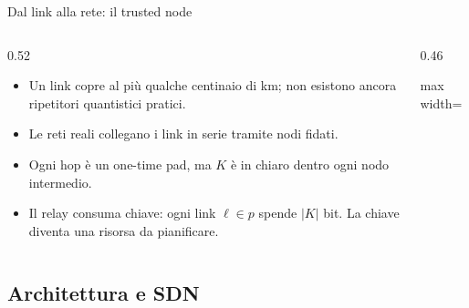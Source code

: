 \documentclass[10pt]{beamer}
\begin{document}
\begin{frame}{Dal link alla rete: il trusted node}
  \begin{columns}[c]
    \begin{column}{0.52\textwidth}
      \begin{itemize}
        \item Un link copre al più qualche centinaio di km; non esistono
              ancora ripetitori quantistici pratici.
        \item Le reti reali collegano i link in serie tramite
              \alert{nodi fidati}.
        \item Ogni hop è un one-time pad, ma $K$ è in chiaro dentro ogni
              nodo intermedio.
        \item Il relay \alert{consuma chiave}: ogni link $\ell\in p$ spende
              $|K|$ bit. La chiave diventa una risorsa da pianificare.
      \end{itemize}
    \end{column}
    \begin{column}{0.46\textwidth}
      \begin{center}\begin{adjustbox}{max width=\linewidth}
      \end{adjustbox}\end{center}
    \end{column}
  \end{columns}
\end{frame}

\subsection{Architettura e SDN}
\end{document}
